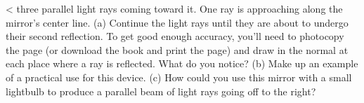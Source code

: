 <%
three parallel light rays coming toward it. One ray is
approaching along the mirror's center line. (a) Continue the light rays until they
are about to undergo their second reflection.  To get good enough accuracy, you'll need to
photocopy the page (or download the book and print the page)
and draw in the normal at each place where a ray is reflected.
What do you notice?
(b) Make up an example of a practical use for this device.
(c) How could you use this mirror with a small lightbulb to
produce a parallel beam of light rays going off to the right?
